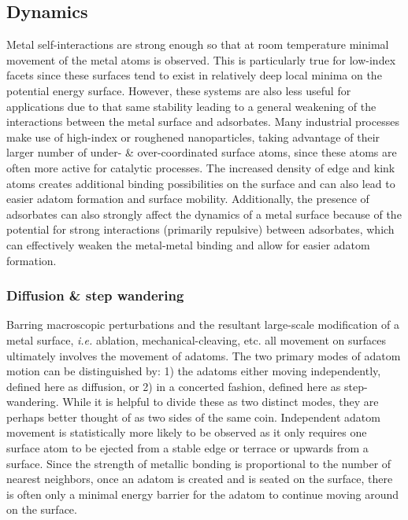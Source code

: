 \subsection{Dynamics}
Metal self-interactions are strong enough so that at room temperature minimal
movement of the metal atoms is observed. This is particularly true for
low-index facets since these surfaces tend to exist in relatively deep local
minima on the potential energy surface. However, these systems are also less
useful for applications due to that same stability leading to a general
weakening of the interactions between the metal surface and adsorbates.  Many
industrial processes make use of high-index or roughened nanoparticles, taking
advantage of their larger number of under- \& over-coordinated surface atoms,
since these atoms are often more active for catalytic
processes.\citep{Calle-Vallejo:2015qq, Stephens:2011bv} The increased density
of edge and kink atoms creates additional binding possibilities on the surface
and can also lead to easier adatom formation and surface mobility.
Additionally, the presence of adsorbates can also strongly affect the dynamics
of a metal surface because of the potential for strong interactions (primarily
repulsive) between adsorbates, which can effectively weaken the metal-metal
binding and allow for easier adatom formation.\citep{Tao:2010aa, Eren:2016qt}


\subsubsection{Diffusion \& step wandering}
Barring macroscopic perturbations and the resultant large-scale modification of
a metal surface, {\em i.e.} ablation, mechanical-cleaving, etc. all movement on
surfaces ultimately involves the movement of adatoms. The two primary modes of
adatom motion can be distinguished by: 1) the adatoms either moving
independently, defined here as diffusion, or 2) in a concerted fashion, defined
here as step-wandering. While it is helpful to divide these as two distinct
modes, they are perhaps better thought of as two sides of the same coin.
Independent adatom movement is statistically more likely to be observed as it
only requires one surface atom to be ejected from a stable edge or terrace or
upwards from a surface.  Since the strength of metallic bonding is proportional
to the number of nearest neighbors, once an adatom is created and is seated on
the surface, there is often only a minimal energy barrier for the adatom to
continue moving around on the surface.

